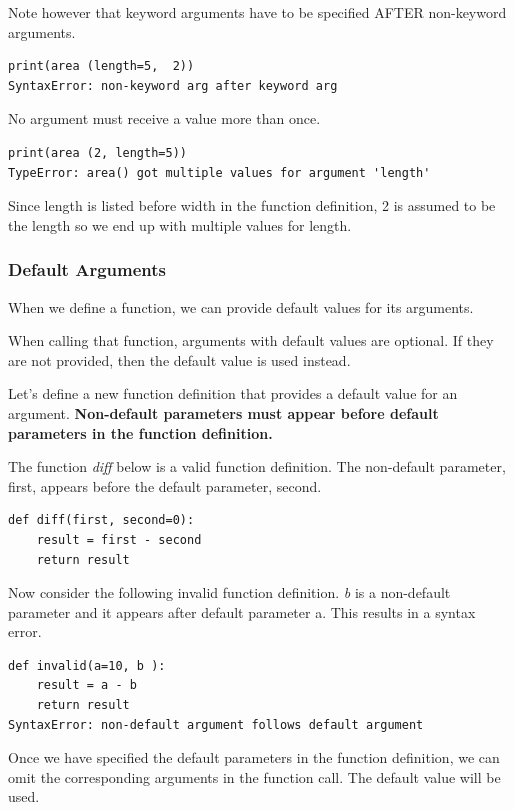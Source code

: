 \documentclass{article}
\begin{document}
Note however that keyword arguments have to be specified AFTER non-keyword arguments.
\\
\begin{lstlisting}
print(area (length=5,  2)) 
SyntaxError: non-keyword arg after keyword arg
\end{lstlisting}

No argument must receive a value more than once.
\begin{lstlisting}
print(area (2, length=5)) 
TypeError: area() got multiple values for argument 'length'
\end{lstlisting}

Since length is listed before width in the function definition, 2 is assumed to be the length so we end up with multiple values for length.

\subsubsection{Default Arguments}

When we define a function, we can provide default values for its arguments.

When calling that function, arguments with default values are optional. If they are not provided, then the default value is used instead.

Let's define  a new function definition that provides a default value for an argument.  \textbf{Non-default parameters must appear before default parameters in the function definition.} 

The function \textit{diff} below is a valid function definition.  The non-default parameter, first, appears before the default parameter, second.  
 
\begin{lstlisting}
def diff(first, second=0):
    result = first - second 
    return result 
\end{lstlisting}

Now consider the following invalid function definition.  \textit{b} is a non-default parameter and it appears after default parameter a.  This results in a syntax error.

\begin{lstlisting}
def invalid(a=10, b ):
    result = a - b 
    return result 
SyntaxError: non-default argument follows default argument
\end{lstlisting}

Once we have specified the default parameters in the function definition, we can omit the corresponding arguments in the function call.  The default value will be used.
\end{document}
